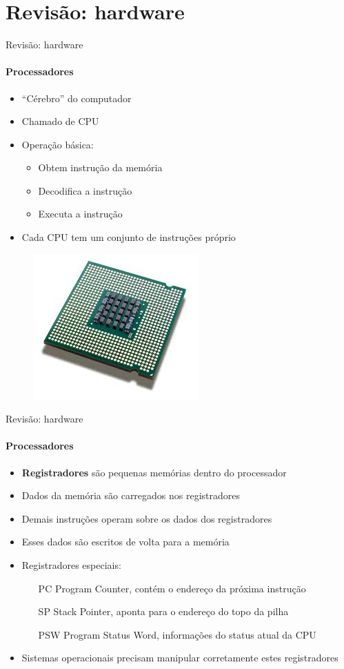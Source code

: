 \documentclass{beamer}
\begin{document}
\section{Revisão: hardware}
\begin{frame}{Revisão: hardware}
	\framesubtitle{Processadores}
	\begin{itemize}
		\item ``Cérebro'' do computador
		\item Chamado de \alert{CPU}
		\item Operação básica:
		\begin{itemize}
			\item Obtem instrução da memória
			\item Decodifica a instrução
			\item Executa a instrução
		\end{itemize}
		\item Cada CPU tem um \alert{conjunto de instruções} próprio
	\end{itemize}
	\begin{figure}
		\includegraphics[width=0.3\paperwidth]{resources/processor}
	\end{figure}
\end{frame}
\begin{frame}{Revisão: hardware}
	\framesubtitle{Processadores}
	\begin{itemize}
		\item \textbf{Registradores} são pequenas memórias dentro do processador
		\item Dados da memória são carregados nos registradores
		\item Demais instruções operam sobre os dados dos registradores
		\item Esses dados são escritos de volta para a memória
		\item Registradores especiais:
			\begin{itemize}
				\item[PC] Program Counter, contém o endereço da próxima instrução
				\item[SP] Stack Pointer, aponta para o endereço do topo da pilha
				\item[PSW] Program Status Word, informações do status atual da CPU
			\end{itemize}
		\item Sistemas operacionais precisam manipular corretamente estes registradores
	\end{itemize}
\end{frame}
\end{document}
